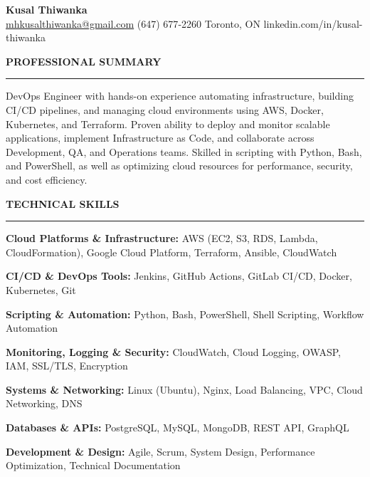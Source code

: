 \documentclass[10pt,letterpaper]{article}
\begin{document}
\begin{center}
{\LARGE\textbf{Kusal Thiwanka}}\\[3pt]
\href{mailto:mhkusalthiwanka@gmail.com}{mhkusalthiwanka@gmail.com}\hspace{2em}%
(647) 677{-}2260\hspace{2em}%
Toronto, ON\hspace{2em}
linkedin.com/in/kusal-thiwanka
\end{center}

\vspace{6pt}

\textbf{PROFESSIONAL SUMMARY}\\[-8pt]
\noindent\rule{\textwidth}{1pt}

\vspace{-2pt}

DevOps Engineer with hands-on experience automating infrastructure, building CI/CD pipelines, and managing cloud environments using AWS, Docker, Kubernetes, and Terraform. Proven ability to deploy and monitor scalable applications, implement Infrastructure as Code, and collaborate across Development, QA, and Operations teams. Skilled in scripting with Python, Bash, and PowerShell, as well as optimizing cloud resources for performance, security, and cost efficiency.

\vspace{8pt}

\textbf{TECHNICAL SKILLS}\\[-8pt]
\noindent\rule{\textwidth}{1pt}

\vspace{-2pt}

\textbf{Cloud Platforms \& Infrastructure:} AWS (EC2, S3, RDS, Lambda, CloudFormation), Google Cloud Platform, Terraform, Ansible, CloudWatch

\textbf{CI/CD \& DevOps Tools:} Jenkins, GitHub Actions, GitLab CI/CD, Docker, Kubernetes, Git

\textbf{Scripting \& Automation:} Python, Bash, PowerShell, Shell Scripting, Workflow Automation

\textbf{Monitoring, Logging \& Security:} CloudWatch, Cloud Logging, OWASP, IAM, SSL/TLS, Encryption

\textbf{Systems \& Networking:} Linux (Ubuntu), Nginx, Load Balancing, VPC, Cloud Networking, DNS

\textbf{Databases \& APIs:} PostgreSQL, MySQL, MongoDB, REST API, GraphQL

\textbf{Development \& Design:} Agile, Scrum, System Design, Performance Optimization, Technical Documentation
\end{document}

